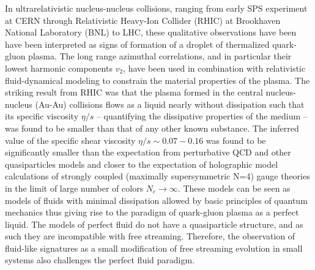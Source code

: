 \documentclass[../report.tex]{subfiles}
\begin{document}
In ultrarelativistic nucleus-nucleus collisions, ranging from early SPS experiment at CERN through Relativistic Heavy-Ion Collider (RHIC) at Brookhaven National Laboratory (BNL) to LHC, these qualitative observations have been have been interpreted as signs of formation of a droplet of thermalized quark-gluon plasma. The long range azimuthal correlations, and in particular their lowest harmonic components $v_2$, have been used in combination with relativistic fluid-dynamical modeling to constrain the material properties of the plasma.  The striking result from RHIC was that the plasma formed in the central nucleus-nucleus (Au-Au) collisions flows as a liquid nearly without dissipation such that its specific viscosity $\eta/s$ -- quantifying the dissipative properties of the medium -- was found to be smaller than that of any other known substance. The inferred value of the specific shear viscosity $\eta/s\sim 0.07-0.16$ \cite{} was found to be significantly smaller than the expectation from perturbative QCD and other quasiparticles models and closer to the expectation of holographic model calculations of strongly coupled (maximally supersymmetric N=4) gauge theories in the limit of large number of colors $N_c \rightarrow \infty$. These models can be seen as models of fluids with minimal dissipation allowed by basic principles of  quantum mechanics thus giving rise to the paradigm of quark-gluon plasma as a perfect liquid. The models of perfect fluid do not have a quasiparticle structure, and as such they are incompatible with free streaming. Therefore, the observation of fluid-like signatures as a small modification of free streaming evolution in small systems also challenges the perfect fluid paradigm. 
\end{document}
